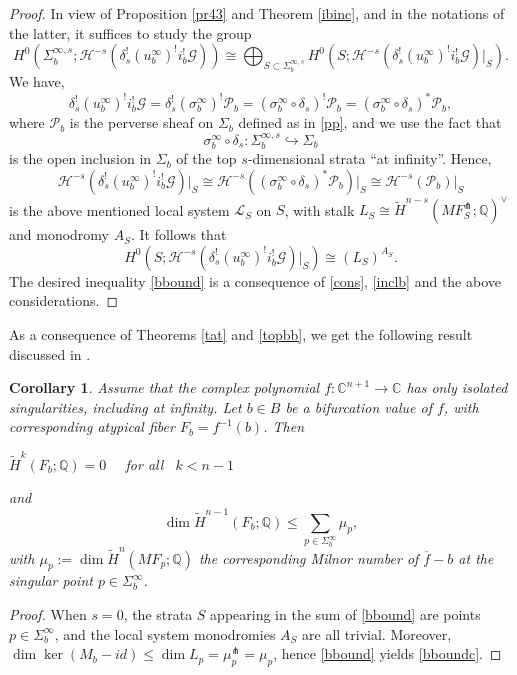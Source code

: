 \documentclass[12pt,leqno,twoside]{amsart}
\newtheorem{corollary}[theorem]{Corollary}
\theoremstyle{remark}
\theoremstyle{remark}
\theoremstyle{definition}
\theoremstyle{remark}
\theoremstyle{remark}
\theoremstyle{remark}
\numberwithin{equation}{section}  %
\def\be{\begin{equation}}
\def\ee{\end{equation}}
\def\bc{\begin{corollary}}
\def\ec{\end{corollary}}
\newcommand{\cG}{\mathcal{G}}
\newcommand{\cH}{\mathcal{H}}
\newcommand{\cL}{\mathcal{L}}
\newcommand{\cP}{\mathcal{P}}
\newcommand{\bC}{\mathbb{C}}
\newcommand{\bQ}{\mathbb{Q}}
\newcommand{\of}{\overline{f}}
\newcommand{\wti}{\widetilde}
\begin{document}
\begin{proof}
In view of Proposition \ref{pr43} and Theorem \ref{ibinc}, and in the notations of the latter, it suffices to study the group
\[H^0(\Sigma_b^{\infty,s}; \cH^{-s}(\delta_s^! (u_b^\infty)^!i_b^! \cG)) \cong 
\bigoplus_{S \subset \Sigma_b^{\infty,s}} H^0(S; \cH^{-s}(\delta_s^! (u_b^\infty)^!i_b^! \cG)\vert_S).  \]
We have,
\[\delta_s^! (u_b^\infty)^!i_b^! \cG = \delta_s^! (\sigma_b^\infty)^!\cP_b=  (\sigma_b^\infty \circ \delta_s)^!\cP_b = (\sigma_b^\infty \circ \delta_s)^*\cP_b,\]
where $\cP_b$ is the perverse sheaf on $\Sigma_b$ defined as in \eqref{pp}, and we use the fact that \[\sigma_b^\infty \circ \delta_s:\Sigma_b^{\infty,s} \hookrightarrow \Sigma_b\] is the open inclusion in $\Sigma_b$ of the top $s$-dimensional strata ``at infinity''. Hence,
\[\cH^{-s}(\delta_s^! (u_b^\infty)^!i_b^! \cG)\vert_S \cong \cH^{-s}( (\sigma_b^\infty \circ \delta_s)^*\cP_b)\vert_S \cong  \cH^{-s}(\cP_b)\vert_S\]
is the above mentioned local system $\cL_S$ on $S$, with stalk $L_S\cong \wti{H}^{n-s}(MF^\pitchfork_{S};\bQ)^\vee$ and monodromy $A_S$. It follows that
\[H^0(S; \cH^{-s}(\delta_s^! (u_b^\infty)^!i_b^! \cG)\vert_S) \cong (L_S)^{A_S}.\]
 The desired inequality \eqref{bbound} is a consequence of \eqref{cons}, \eqref{inclb} and the above considerations.
\end{proof}

As a consequence of Theorems \ref{tat} and \ref{topbb}, we get the following result discussed in \cite[Thm.6.3.23]{Di}.

\bc\label{topbbc}
Assume that the complex polynomial $f\colon \bC^{n+1} \to \bC$ has only isolated singularities, including at infinity. Let $b \in B$ be a bifurcation value of $f$, with corresponding atypical fiber $F_b=f^{-1}(b)$. Then
\begin{center}
$\wti{H}^k(F_b;\bQ)=0$ \ \ for all \ $k < n-1$
\end{center}
and
\be\label{bboundc}
\dim  \wti{H}^{n-1}(F_b;\bQ) \leq \sum_{p \in \Sigma_b^\infty} \mu_p,
\ee
with $\mu_p:=\dim \wti{H}^{n}(MF_p;\bQ)$ the corresponding Milnor number of $\of-b$ at the singular point $p\in \Sigma_b^\infty$.
\ec


\begin{proof}
When $s=0$, the strata $S$ appearing in the sum of \eqref{bbound} are points $p \in \Sigma_b^\infty$, and the local system monodromies $A_S$ are all trivial. Moreover, $\dim \ker(M_b-id)\leq \dim L_p = \mu^\pitchfork_p=\mu_p$, hence \eqref{bbound} yields \eqref{bboundc}.
\end{proof}
\end{document}
